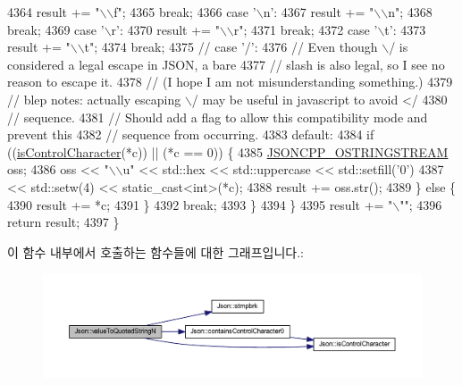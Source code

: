 \begin{DoxyCode}
4364       result += \textcolor{stringliteral}{"\(\backslash\)\(\backslash\)f"};
4365       \textcolor{keywordflow}{break};
4366     \textcolor{keywordflow}{case} \textcolor{charliteral}{'\(\backslash\)n'}:
4367       result += \textcolor{stringliteral}{"\(\backslash\)\(\backslash\)n"};
4368       \textcolor{keywordflow}{break};
4369     \textcolor{keywordflow}{case} \textcolor{charliteral}{'\(\backslash\)r'}:
4370       result += \textcolor{stringliteral}{"\(\backslash\)\(\backslash\)r"};
4371       \textcolor{keywordflow}{break};
4372     \textcolor{keywordflow}{case} \textcolor{charliteral}{'\(\backslash\)t'}:
4373       result += \textcolor{stringliteral}{"\(\backslash\)\(\backslash\)t"};
4374       \textcolor{keywordflow}{break};
4375     \textcolor{comment}{// case '/':}
4376     \textcolor{comment}{// Even though \(\backslash\)/ is considered a legal escape in JSON, a bare}
4377     \textcolor{comment}{// slash is also legal, so I see no reason to escape it.}
4378     \textcolor{comment}{// (I hope I am not misunderstanding something.)}
4379     \textcolor{comment}{// blep notes: actually escaping \(\backslash\)/ may be useful in javascript to avoid </}
4380     \textcolor{comment}{// sequence.}
4381     \textcolor{comment}{// Should add a flag to allow this compatibility mode and prevent this}
4382     \textcolor{comment}{// sequence from occurring.}
4383     \textcolor{keywordflow}{default}:
4384       \textcolor{keywordflow}{if} ((\hyperlink{namespace_json_a0381e631737f51331065a388f4f59197}{isControlCharacter}(*c)) || (*c == 0)) \{
4385         \hyperlink{json-forwards_8h_a1d06ac2ca63c8c521f41231dfda0e6b3}{JSONCPP\_OSTRINGSTREAM} oss;
4386         oss << \textcolor{stringliteral}{"\(\backslash\)\(\backslash\)u"} << std::hex << std::uppercase << std::setfill(\textcolor{charliteral}{'0'})
4387             << std::setw(4) << \textcolor{keyword}{static\_cast<}\textcolor{keywordtype}{int}\textcolor{keyword}{>}(*c);
4388         result += oss.str();
4389       \} \textcolor{keywordflow}{else} \{
4390         result += *c;
4391       \}
4392       \textcolor{keywordflow}{break};
4393     \}
4394   \}
4395   result += \textcolor{stringliteral}{"\(\backslash\)""};
4396   \textcolor{keywordflow}{return} result;
4397 \}
\end{DoxyCode}
이 함수 내부에서 호출하는 함수들에 대한 그래프입니다.\+:\nopagebreak
\begin{figure}[H]
\begin{center}
\leavevmode
\includegraphics[width=350pt]{namespace_json_a29aff81733b8fdaabf3f1acfc3ad339f_cgraph}
\end{center}
\end{figure}
